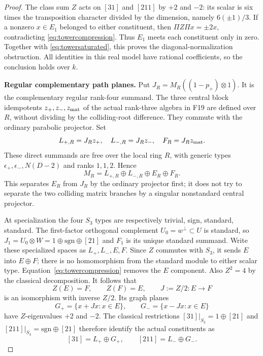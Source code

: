 \documentclass[11pt,a4paper]{article}
\newcommand{\fid}[1]{\textsf{#1}}\newcommand{\gate}[1]{\textsf{#1}}
\theoremstyle{named}\newtheorem{finding}{Finding}[section]
\theoremstyle{definition}\newtheorem{definition}[finding]{Definition}
\theoremstyle{remark}\newtheorem{remark}[finding]{Remark}
\begin{document}
\begin{proof}
The class sum $Z$ acts on $[31]$ and $[211]$ by $+2$ and $-2$:
its scalar is six times the transposition character divided by the
dimension, namely $6(\pm1)/3$. If a nonzero $x\in E_1$ belonged
to either constituent, then $\Pi Z\Pi x=\pm2x$, contradicting
\eqref{eq:towercompression}. Thus $E_1$ meets each constituent only
in zero. Together with \eqref{eq:towersaturated}, this proves the
diagonal-normalization obstruction. All identities in this real
model have rational coefficients, so the conclusion holds over $k$.

\par\smallskip\noindent\textbf{Regular complementary path planes.}\quad
Put $J_R=M_R((1-p_+)\otimes1)$. It is the complementary regular
rank-four summand. The three central block idempotents
$z_+,z_-,z_{\rm mat}$ of the actual rank-three algebra in \fid{F19}
are defined over $R$, without dividing by the colliding-root
difference. They commute with the ordinary parabolic projector.
Set
\[
 L_{+,R}=J_Rz_+,\quad L_{-,R}=J_Rz_-,\quad F_R=J_Rz_{\rm mat}.
\]
These direct summands are free over the local ring $R$, with generic
types $\epsilon_+,\epsilon_-,N(D-2)$ and ranks $1,1,2$. Hence
\[
 M_R=L_{+,R}\oplus L_{-,R}\oplus E_R\oplus F_R.
\]
This separates $E_R$ from $J_R$ by the ordinary projector first;
it does not try to separate the two colliding matrix branches by a
singular nonstandard central projector.

At specialization the four $S_3$ types are respectively trivial,
sign, standard, standard. The first-factor orthogonal complement
$U_0=w^\perp\subset U$ is standard, so
$J_1=U_0\otimes W=1\oplus\mathrm{sgn}\oplus[21]$ and $F_1$
is its unique standard summand. Write these specialized spaces as
$L_+,L_-,E,F$. Since $Z$ commutes with $S_3$, it sends $E$ into
$E\oplus F$; there is no homomorphism from the standard module
to either scalar type. Equation~\eqref{eq:towercompression} removes
the $E$ component. Also $Z^2=4$ by the classical decomposition.
It follows that
\[
 Z(E)=F,\qquad Z(F)=E,\qquad J:=Z/2:E\longrightarrow F
\]
is an isomorphism with inverse $Z/2$. Its graph planes
\[
 G_+=\{x+Jx:x\in E\},\qquad G_-=\{x-Jx:x\in E\}
\]
have $Z$-eigenvalues $+2$ and $-2$. The classical restrictions
$[31]|_{S_3}=1\oplus[21]$ and
$[211]|_{S_3}=\mathrm{sgn}\oplus[21]$ therefore identify the
actual constituents as
\begin{equation}\label{eq:towergraphs}
 [31]=L_+\oplus G_+,\qquad [211]=L_-\oplus G_-.
\end{equation}


\end{proof}
\end{document}
